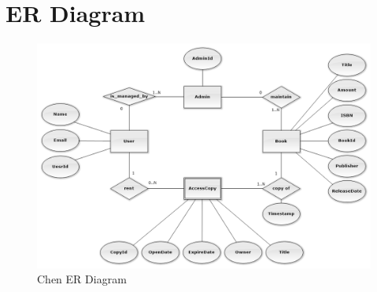 \chapter{ER Diagram}

\begin{figure}[ht]
    \centering
    \includegraphics[width=\linewidth]{image/ChenERDiagram.png}
    \captionsetup{justification=centering}
    \caption{Chen ER Diagram}
\end{figure}
